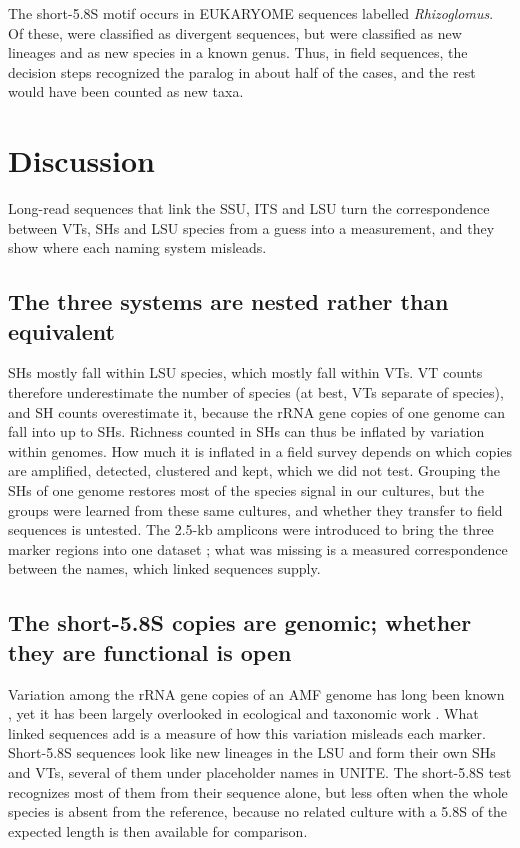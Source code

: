 \documentclass[11pt]{article}
\newcommand{\spn}[1]{\emph{#1}}   %
\begin{document}
The short-5.8S motif occurs in \EkFxMotifRhiz{} EUKARYOME sequences labelled \spn{Rhizoglomus}. Of these,
\EkFxMotifRhizDiv{} were classified as divergent sequences, but \EkFxMotifRhizLineage{} were classified as new
lineages and \EkFxMotifRhizNewSp{} as new species in a known genus. Thus, in field sequences, the decision steps
recognized the paralog in about half of the cases, and the rest would have been counted as new taxa.


\section{Discussion}
Long-read sequences that link the SSU, ITS and LSU turn the correspondence between VTs, SHs and LSU species from a
guess into a measurement, and they show where each naming system misleads.

\subsection{The three systems are nested rather than equivalent}
SHs mostly fall within LSU species, which mostly fall within VTs. VT counts therefore underestimate the number of
species (at best, VTs separate \VTResolvedZero{} of \NSpecies{} species), and SH counts overestimate it, because the
rRNA gene copies of one genome can fall into up to \SHSplitMax{} SHs. Richness counted in SHs can thus be inflated by
variation within genomes. How much it is inflated in a field survey depends on which copies are amplified, detected,
clustered and kept, which we did not test. Grouping the SHs of one genome restores most of the species signal in our
cultures, but the groups were learned from these same cultures, and whether they transfer to field sequences is
untested. The 2.5-kb amplicons were introduced to bring the three marker regions into one dataset
\cite{kolarikova2021pacbio}; what was missing is a measured correspondence between the names, which linked
sequences supply.

\subsection{The short-5.8S copies are genomic; whether they are functional is open}
Variation among the rRNA gene copies of an AMF genome has long been known
\cite{pawlowska2004organization,vankuren2013rdna}, yet it has been largely overlooked in ecological and taxonomic
work \cite{stefani2025rdna}. What linked sequences add is a measure of how this variation misleads each marker.
Short-5.8S sequences look like new lineages in the LSU and form their own SHs and VTs, several of them under
placeholder names in UNITE. The short-5.8S test recognizes most of them from their sequence alone, but less often when
the whole species is absent from the reference, because no related culture with a 5.8S of the expected length is
then available for comparison.
\end{document}
